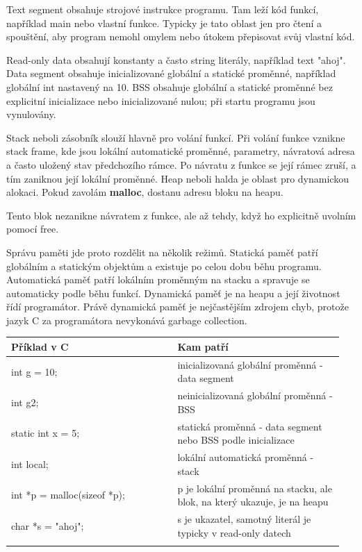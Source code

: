 Text segment obsahuje strojové instrukce programu. Tam leží kód funkcí, například main nebo vlastní funkce. Typicky je tato oblast jen pro čtení a spouštění, aby program nemohl omylem nebo útokem přepisovat svůj vlastní kód.

Read-only data obsahují konstanty a často string literály, například text "ahoj". Data segment obsahuje inicializované globální a statické proměnné, například globální int nastavený na 10. BSS obsahuje globální a statické proměnné bez explicitní inicializace nebo inicializované nulou; při startu programu jsou vynulovány.


Stack neboli zásobník slouží hlavně pro volání funkcí. Při volání funkce vznikne stack frame, kde jsou lokální automatické proměnné, parametry, návratová adresa a často uložený stav předchozího rámce. Po návratu z funkce se její rámec zruší, a tím zaniknou její lokální proměnné. Heap neboli halda je oblast pro dynamickou alokaci. Pokud zavolám \textbf{malloc}, dostanu adresu bloku na heapu.

Tento blok nezanikne návratem z funkce, ale až tehdy, když ho explicitně uvolním pomocí free.

Správu paměti jde proto rozdělit na několik režimů. Statická paměť patří globálním a statickým objektům a existuje po celou dobu běhu programu. Automatická paměť patří lokálním proměnným na stacku a spravuje se automaticky podle běhu funkcí. Dynamická paměť je na heapu a její životnost řídí programátor. Právě dynamická paměť je nejčastějším zdrojem chyb, protože jazyk C za programátora nevykonává garbage collection.

\begin{longtable}{p{0.475\linewidth}p{0.475\linewidth}}
\toprule
\textbf{Příklad v C} & \textbf{Kam patří} \\
\midrule\endhead
int g = 10; & inicializovaná globální proměnná - data segment \\
\addlinespace
int g2; & neinicializovaná globální proměnná - BSS \\
\addlinespace
static int x = 5; & statická proměnná - data segment nebo BSS podle inicializace \\
\addlinespace
int local; & lokální automatická proměnná - stack \\
\addlinespace
int *p = malloc(sizeof *p); & p je lokální proměnná na stacku, ale blok, na který ukazuje, je na heapu \\
\addlinespace
char *s = "ahoj"; & s je ukazatel, samotný literál je typicky v read-only datech \\
\addlinespace
\bottomrule
\end{longtable}

